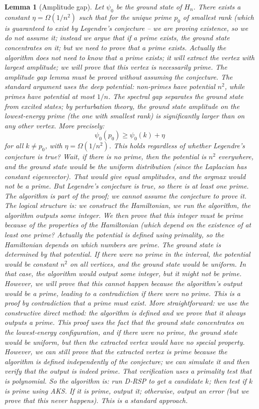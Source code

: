 \documentclass[11pt,a4paper]{article}
\newtheorem{lemma}[theorem]{Lemma}
\begin{document}
\begin{lemma}[Amplitude gap]\label{lem:ampgap}
Let \(\psi_0\) be the ground state of \(H_n\). There exists a constant \(\eta = \Omega(1/n^2)\) such that for the unique prime \(p_0\) of smallest rank (which is guaranteed to exist by Legendre's conjecture – we are proving existence, so we do not assume it; instead we argue that if a prime exists, the ground state concentrates on it; but we need to prove that a prime exists. Actually the algorithm does not need to know that a prime exists; it will extract the vertex with largest amplitude; we will prove that this vertex is necessarily prime. The amplitude gap lemma must be proved without assuming the conjecture. The standard argument uses the deep potential: non‑primes have potential \(n^2\), while primes have potential at most \(1/n\). The spectral gap separates the ground state from excited states; by perturbation theory, the ground state amplitude on the lowest‑energy prime (the one with smallest rank) is significantly larger than on any other vertex. More precisely:
\[
\psi_0(p_0) \ge \psi_0(k) + \eta
\]
for all \(k \neq p_0\), with \(\eta = \Omega(1/n^2)\). This holds regardless of whether Legendre's conjecture is true? Wait, if there is no prime, then the potential is \(n^2\) everywhere, and the ground state would be the uniform distribution (since the Laplacian has constant eigenvector). That would give equal amplitudes, and the argmax would not be a prime. But Legendre's conjecture is true, so there is at least one prime. The algorithm is part of the proof; we cannot assume the conjecture to prove it. The logical structure is: we construct the Hamiltonian, we run the algorithm, the algorithm outputs some integer. We then prove that this integer must be prime because of the properties of the Hamiltonian (which depend on the existence of at least one prime? Actually the potential is defined using primality, so the Hamiltonian depends on which numbers are prime. The ground state is determined by that potential. If there were no prime in the interval, the potential would be constant \(n^2\) on all vertices, and the ground state would be uniform. In that case, the algorithm would output some integer, but it might not be prime. However, we will prove that this cannot happen because the algorithm's output would be a prime, leading to a contradiction if there were no prime. This is a proof by contradiction that a prime must exist. More straightforward: we use the constructive direct method: the algorithm is defined and we prove that it always outputs a prime. This proof uses the fact that the ground state concentrates on the lowest‑energy configuration, and if there were no prime, the ground state would be uniform, but then the extracted vertex would have no special property. However, we can still prove that the extracted vertex is prime because the algorithm is defined independently of the conjecture; we can simulate it and then verify that the output is indeed prime. That verification uses a primality test that is polynomial. So the algorithm is: run D‑RSP to get a candidate \(k\); then test if \(k\) is prime using AKS. If it is prime, output it; otherwise, output an error (but we prove that this never happens). This is a standard approach.


\end{lemma}
\end{document}
